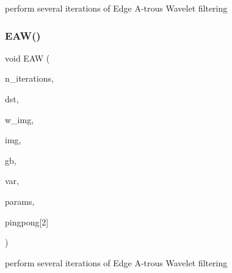 perform several iterations of Edge A-\/trous Wavelet filtering \mbox{\label{group___filtering_module_ga555e254676c54ef667565bdd2ca61860}} 
\subsubsection{\texorpdfstring{E\+A\+W()}{EAW()}\hspace{0.1cm}{\footnotesize\ttfamily [5/5]}}
{\footnotesize\ttfamily void E\+AW (\begin{DoxyParamCaption}\item[{const uint32}]{n\+\_\+iterations,  }\item[{\hyperlink{struct_f_buffer_channel_view}{F\+Buffer\+Channel\+View}}]{dst,  }\item[{const \hyperlink{struct_f_buffer_channel_view}{F\+Buffer\+Channel\+View}}]{w\+\_\+img,  }\item[{const \hyperlink{struct_f_buffer_channel_view}{F\+Buffer\+Channel\+View}}]{img,  }\item[{const \hyperlink{struct_g_buffer_view}{G\+Buffer\+View}}]{gb,  }\item[{const float $\ast$}]{var,  }\item[{const \hyperlink{struct_e_a_w_params}{E\+A\+W\+Params}}]{params,  }\item[{\hyperlink{struct_f_buffer_channel_view}{F\+Buffer\+Channel\+View}}]{pingpong\mbox{[}2\mbox{]} }\end{DoxyParamCaption})}

perform several iterations of Edge A-\/trous Wavelet filtering \mbox{\label{group___filtering_module_gaa39afad6e4488ce8af5d5ef4f0a48f00}} 
